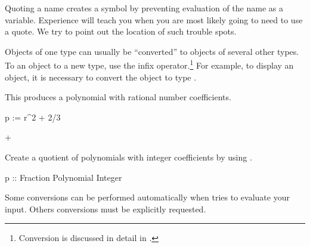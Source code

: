 {{{{{{{{Quoting a name creates a symbol by
preventing evaluation of the name as a variable.
Experience will teach you when you are most likely going to need to use
a quote.
We try to point out the location of such trouble spots.


Objects of one type can usually be ``converted'' to objects of several
other types.
To 
an object to a new type, use the \spadSyntax{::} infix
operator.\footnote{Conversion is discussed in detail in .}
For example, to display an object, it is necessary to
convert the object to type .

\begin{xtc}
\begin{xtccomment}
This produces a polynomial with rational number coefficients.
\end{xtccomment}
\begin{spadsrc}
p := r^2 + 2/3 
\end{spadsrc}
\begin{TeXOutput}
\begin{fricasmath}{1}
+%
\end{fricasmath}
\end{TeXOutput}
\end{xtc}
\begin{xtc}
\begin{xtccomment}
Create a quotient of polynomials with integer coefficients
by using \spadSyntax{::}.
\end{xtccomment}
\begin{spadsrc}
p :: Fraction Polynomial Integer 
\end{spadsrc}
\begin{TeXOutput}
\begin{fricasmath}{2}
%
\end{fricasmath}
\end{TeXOutput}
\end{xtc}

Some conversions can be performed automatically when
\Language{} tries to evaluate your input.
Others conversions must be explicitly requested.

}}}}}}}}
